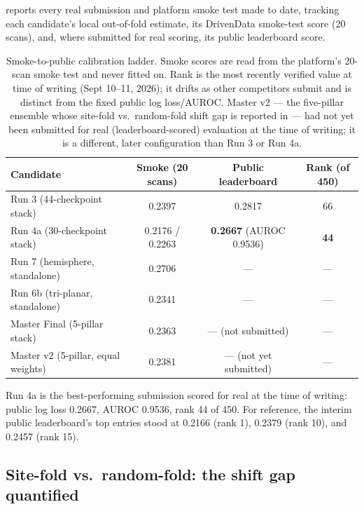 \documentclass[10pt]{article}
\begin{document}
 reports every real submission and platform smoke test made to date, tracking each candidate's local out-of-fold estimate, its DrivenData smoke-test score (20 scans), and, where submitted for real scoring, its public leaderboard score.

\begin{table}[t]
\centering
\small
\caption{Smoke-to-public calibration ladder. Smoke scores are read from the platform's 20-scan smoke test and never fitted on. Rank is the most recently verified value at time of writing (Sept 10--11, 2026); it drifts as other competitors submit and is distinct from the fixed public log loss/AUROC. Master v2 --- the five-pillar ensemble whose site-fold vs.\ random-fold shift gap is reported in  --- had not yet been submitted for real (leaderboard-scored) evaluation at the time of writing; it is a different, later configuration than Run 3 or Run 4a.}
\label{tab:ladder}
\begin{tabular}{@{}lccc@{}}
\toprule
\textbf{Candidate} & \textbf{Smoke (20 scans)} & \textbf{Public leaderboard} & \textbf{Rank (of 450)} \\
\midrule
Run 3 (44-checkpoint stack) & 0.2397 & 0.2817 & 66 \\
Run 4a (30-checkpoint stack) & 0.2176 / 0.2263 & \textbf{0.2667} (AUROC 0.9536) & \textbf{44} \\
Run 7 (hemisphere, standalone) & 0.2706 & --- & --- \\
Run 6b (tri-planar, standalone) & 0.2341 & --- & --- \\
Master Final (5-pillar stack) & 0.2363 & --- (not submitted) & --- \\
Master v2 (5-pillar, equal weights) & 0.2381 & --- (not yet submitted) & --- \\
\bottomrule
\end{tabular}
\end{table}

Run 4a is the best-performing submission scored for real at the time of writing: public log loss 0.2667, AUROC 0.9536, rank 44 of 450. For reference, the interim public leaderboard's top entries stood at 0.2166 (rank 1), 0.2379 (rank 10), and 0.2457 (rank 15).

\subsection{Site-fold vs.\ random-fold: the shift gap quantified}
\label{sec:shiftgap-results}
\end{document}
